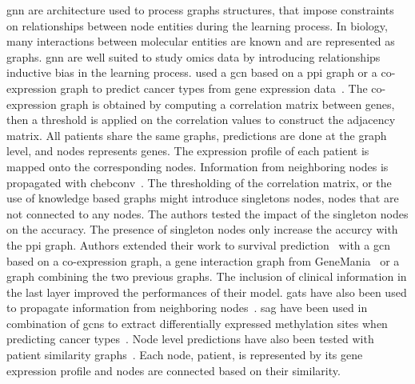 \documentclass[../main.tex]{subfiles}
\begin{document}
 \Gls{gnn} are architecture used to process graphs structures, that impose constraints on relationships between node entities during the learning process.
 In biology, many interactions between molecular entities are known and are represented as graphs.
 \Gls{gnn} are well suited to study omics data by introducing relationships inductive bias in the learning process.
 \citeauthor{Ramirez2020} used a \gls{gcn} based on a \gls{ppi} graph or a co-expression graph to predict cancer types from gene expression data~\cite{Ramirez2020}.
 The co-expression graph is obtained by computing a correlation matrix between genes, then a threshold is applied on the correlation values to construct the adjacency matrix.
 All patients share the same graphs, predictions are done at the graph level, and nodes represents genes.
 The expression profile of each patient is mapped onto the corresponding nodes.
 Information from neighboring nodes is propagated with \gls{chebconv}~\cite{ChebConv}.
 The thresholding of the correlation matrix, or the use of knowledge based graphs might introduce singletons nodes, \ie{}nodes that are not connected to any nodes.
 The authors tested the impact of the singleton nodes on the accuracy.
 The presence of singleton nodes only increase the accurcy with the \gls{ppi} graph.
 Authors extended their work to survival prediction~\cite{Ramirez2021} with a \gls{gcn} based on a co-expression graph, a gene interaction graph from GeneMania~\cite{WardeFarley2010} or a graph combining the two previous graphs.
 The inclusion of clinical information in the last layer improved the performances of their model.
 \Glspl{gat} have also been used to propagate information from neighboring nodes~\cite{Xing2021}.
 \Gls{sag} have been used in combination of \glspl{gcn} to extract differentially expressed methylation sites when predicting cancer types~\cite{Jiang2023}.
 Node level predictions have also been tested with patient similarity graphs~\cite{Baul2022}.
 Each node, \ie{}patient, is represented by its gene expression profile and nodes are connected based on their similarity.
\end{document}
